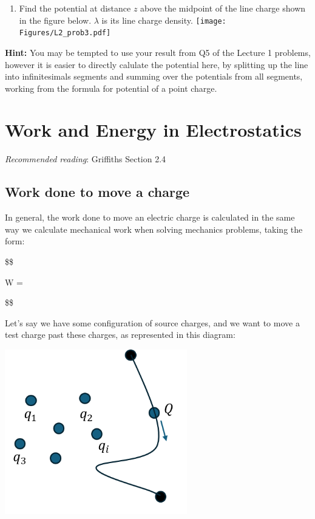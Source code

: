 \documentclass[
  letterpaper,
  DIV=11,
  numbers=noendperiod]{scrreprt}
\providecommand{\tightlist}{%
  \setlength{\itemsep}{0pt}\setlength{\parskip}{0pt}}\usepackage{longtable,booktabs,array}
\begin{document}
\begin{enumerate}
\def\labelenumi{\arabic{enumi})}
\setcounter{enumi}{2}
\tightlist
\item
  Find the potential at distance \(z\) above the midpoint of the line
  charge shown in the figure below. \(\lambda\) is its line charge
  density.
  \texttt{[image: Figures/L2\_prob3.pdf]}
\end{enumerate}

\textbf{Hint:} You may be tempted to use your result from Q5 of the
Lecture 1 problems, however it is easier to directly calulate the
potential here, by splitting up the line into infinitesimals segments
and summing over the potentials from all segments, working from the
formula for potential of a point charge.


\chapter{Work and Energy in
Electrostatics}\label{work-and-energy-in-electrostatics}

\emph{Recommended reading}: Griffiths Section 2.4

\section{Work done to move a charge}\label{work-done-to-move-a-charge}

In general, the work done to move an electric charge is calculated in
the same way we calculate mechanical work when solving mechanics
problems, taking the form:

\$\$

W = \int {} \cdot {}  

\$\$

Let's say we have some configuration of source charges, and we want to
move a test charge past these charges, as represented in this diagram:

\includegraphics[width=3.125in,height=\textheight]{Figures/workdone_charge.png}
\end{document}
